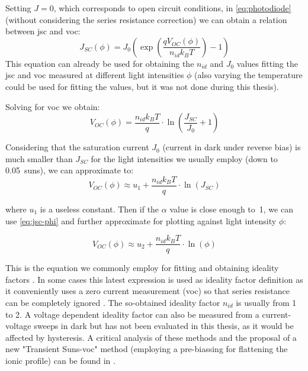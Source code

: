 		Setting $J=0$, which corresponds to open circuit conditions, in \cref{eq:photodiode} (without considering the series resistance correction) we can obtain a relation between \gls{jsc} and \gls{voc}:
		$$J_{SC}(\phi) = J_0\left(\exp\left(\frac{qV_{OC}(\phi)}{n_{id}k_BT}\right)-1\right)$$
		This equation can already be used for obtaining the $n_{id}$ and $J_0$ values fitting the \gls{jsc} and \gls{voc} measured at different light intensities $\phi$ (also varying the temperature could be used for fitting the values, but it was not done during this thesis).

		Solving for \gls{voc} we obtain:
		$$V_{OC}(\phi) = \frac{n_{id}k_BT}{q}\cdot\ln\left(\frac{J_{SC}}{J_0} + 1\right)$$

		Considering that the saturation current $J_0$ (current in dark under reverse bias) is much smaller than $J_{SC}$ for the light intensities we usually employ (down to \SI{0.05}{suns}), we can approximate to:
		$$V_{OC}(\phi) \approx u_1 + \frac{n_{id}k_BT}{q}\cdot\ln(J_{SC})$$

		where $u_1$ is a useless constant. Then if the $\alpha$ value is close enough to~1, we can use \cref{eq:jsc-phi} and further approximate for plotting against light intensity $\phi$:

		$$V_{OC}(\phi) \approx u_2 + \frac{n_{id}k_BT}{q}\cdot\ln(\phi)$$

		This is the equation we commonly employ for fitting and obtaining ideality factors \cite{Nelson2003}. In some cases this latest expression is used as ideality factor definition as it conveniently uses a zero current measurement (\gls{voc}) so that series resistance can be completely ignored \cite{Kirchartz2012}. %
		The so-obtained ideality factor $n_{id}$ is usually from 1 to 2. A voltage dependent ideality factor can also be measured from a current-voltage sweeps in dark but has not been evaluated in this thesis, as it would be affected by hysteresis. A critical analysis of these methods and the proposal of a new "Transient Suns-\gls{voc}" method (employing a pre-biassing for flattening the ionic profile) can be found in . %

